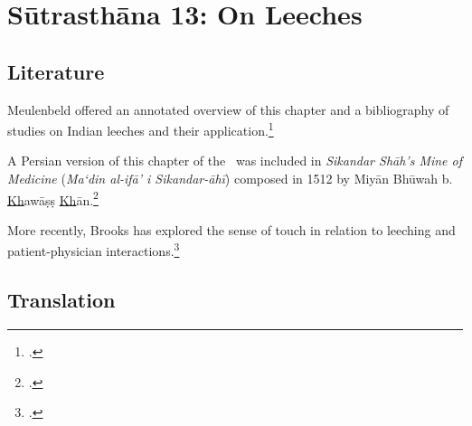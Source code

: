 

\chapter{Sūtrasthāna 13:  On Leeches}


\section{Literature} 


Meulenbeld offered an annotated overview of this chapter and a bibliography
of studies on Indian leeches and their application.\footcite[IA, 209; IB,
324, n.\,131]{meul-hist}

A Persian version of this chapter of the \SS\ was included in \emph{Sikandar
    Shāh's Mine of Medicine} (\emph{Ma`din al-ifā' i
    Sikandar-āhī}) composed in 1512 by Miyān Bhūwah b.
\underline{Kh}awāṣṣ \underline{Kh}ān.\footcites[96--109]{sidd-1959}
{azee-1971} [231--232]{stor-1971} [IB, 324,
n.\,128]{meul-hist}[8--9]{spez-2019}

More recently, Brooks has explored the sense of touch in relation to
leeching and patient-physician
interactions.\footcite{%
    broo-2020,
    broo-2020b,
    broo-2020c,
    broo-2021}

\section{Translation}

